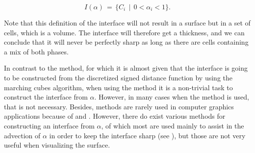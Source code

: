 %
\begin{equation} \label{eq:vof_interface_discrete}
I(\alpha) \,=\, \{C_i \,\mid\, 0 < \alpha_i < 1\}.
\end{equation}

Note that this definition of the interface will not result in a surface but in a set of cells, which is a volume. The interface will therefore get a thickness, and we can conclude that it will never be perfectly sharp as long as there are cells containing a mix of both phases.

In contrast to the \LS method, for which it is almost given that the interface is going to be constructed from the discretized signed distance function by using the marching cubes algorithm, when using the \VOF method it is a non-trivial task to construct the interface from $\alpha$. However, in many cases when the method is used, that is not necessary. Besides, \VOF methods are rarely used in computer graphics applications because of  and  \citep{Wojtan2009}. However, there do exist various methods for constructing an interface from $\alpha$, of which most are used mainly to assist in the advection of $\alpha$ in order to keep the interface sharp (see ), but those are not very useful when visualizing the surface.





